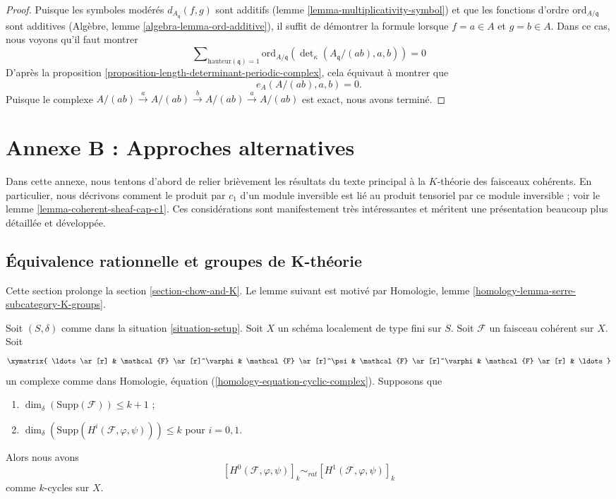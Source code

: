 \begin{proof}
Puisque les symboles modérés $d_{A_{\mathfrak q}}(f, g)$ sont additifs
(lemme \ref{lemma-multiplicativity-symbol}) et que les fonctions d'ordre
$\text{ord}_{A/\mathfrak q}$
sont additives (Algèbre, lemme \ref{algebra-lemma-ord-additive}),
il suffit de démontrer la formule lorsque $f = a \in A$ et
$g = b \in A$. Dans ce cas, nous voyons qu'il faut montrer
$$
\sum\nolimits_{\text{hauteur}(\mathfrak q) = 1}
\text{ord}_{A/\mathfrak q}(\det\nolimits_\kappa(A_{\mathfrak q}/(ab), a, b))
= 0
$$
D'après la proposition \ref{proposition-length-determinant-periodic-complex},
cela équivaut à montrer que
$$
e_A(A/(ab), a, b) = 0.
$$
Puisque le complexe
$A/(ab) \xrightarrow{a} A/(ab) \xrightarrow{b} A/(ab) \xrightarrow{a} A/(ab)$
est exact, nous avons terminé.
\end{proof}





\section{Annexe B : Approches alternatives}
\label{section-appendix-chow}

\noindent
Dans cette annexe, nous tentons d'abord de relier brièvement les résultats
du texte principal à la $K$-théorie des faisceaux cohérents. En
particulier, nous décrivons comment le produit par $c_1$ d'un
module inversible est lié au produit tensoriel par ce module inversible ; voir le
lemme \ref{lemma-coherent-sheaf-cap-c1}.
Ces considérations sont manifestement très intéressantes et
méritent une présentation beaucoup plus détaillée et développée.


\subsection{Équivalence rationnelle et groupes de K-théorie}
\label{subsection-rational-equivalence-K-groups}

\noindent
Cette section prolonge la section \ref{section-chow-and-K}.
Le lemme suivant est motivé par
Homologie, lemme \ref{homology-lemma-serre-subcategory-K-groups}.

\begin{lemma}
\label{lemma-maps-between-coherent-sheaves}
Soit $(S, \delta)$ comme dans la situation \ref{situation-setup}.
Soit $X$ un schéma localement de type fini sur $S$.
Soit $\mathcal{F}$ un faisceau cohérent sur $X$.
Soit
$$
\xymatrix{
\ldots \ar[r] &
\mathcal{F} \ar[r]^\varphi &
\mathcal{F} \ar[r]^\psi &
\mathcal{F} \ar[r]^\varphi &
\mathcal{F} \ar[r] & \ldots
}
$$
un complexe comme dans Homologie, équation (\ref{homology-equation-cyclic-complex}).
Supposons que
\begin{enumerate}
\item $\dim_\delta(\text{Supp}(\mathcal{F})) \leq k + 1$ ;
\item $\dim_\delta(\text{Supp}(H^i(\mathcal{F}, \varphi, \psi))) \leq k$
pour $i = 0, 1$.
\end{enumerate}
Alors nous avons
$$
[H^0(\mathcal{F}, \varphi, \psi)]_k
\sim_{rat}
[H^1(\mathcal{F}, \varphi, \psi)]_k
$$
comme $k$-cycles sur $X$.
\end{lemma}

